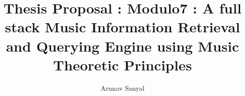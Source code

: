 \documentclass[12pt,oneside,final]{thesis}
\begin{document}
\title{Thesis Proposal : Modulo7 : A full stack Music Information Retrieval and Querying Engine using Music Theoretic Principles}
\author{Arunav Sanyal}
\essay
\masterscience
\copyrightnotice










\end{document}
